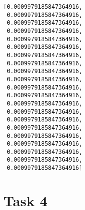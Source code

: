 \documentclass[11pt]{article}
\makeatletter
\newcommand{\boxspacing}{\kern\kvtcb@left@rule\kern\kvtcb@boxsep}
\newcommand{\prompt}[4]{
        {\ttfamily\llap{{\color{#2}[#3]:\hspace{3pt}#4}}\vspace{-\baselineskip}}
    }
\makeatother
\begin{document}
            \begin{tcolorbox}[breakable, size=fbox, boxrule=.5pt, pad at break*=1mm, opacityfill=0]
\prompt{Out}{outcolor}{7}{\boxspacing}
\begin{Verbatim}[commandchars=\\\{\}]
[0.0009979185847364916,
 0.0009979185847364916,
 0.0009979185847364916,
 0.0009979185847364916,
 0.0009979185847364916,
 0.0009979185847364916,
 0.0009979185847364916,
 0.0009979185847364916,
 0.0009979185847364916,
 0.0009979185847364916,
 0.0009979185847364916,
 0.0009979185847364916,
 0.0009979185847364916,
 0.0009979185847364916,
 0.0009979185847364916,
 0.0009979185847364916,
 0.0009979185847364916,
 0.0009979185847364916,
 0.0009979185847364916,
 0.0009979185847364916,
 0.0009979185847364916]
\end{Verbatim}
\end{tcolorbox}
        
    \hypertarget{task-4}{%
\section{Task 4}\label{task-4}}
\end{document}
